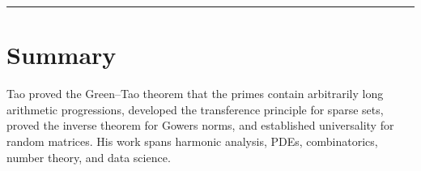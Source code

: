 \begin{center}\rule{0.5\linewidth}{0.5pt}\end{center}

\section*{Summary}

Tao proved the Green--Tao theorem \cite{greentao2008} that the primes contain arbitrarily long arithmetic progressions, developed the transference principle for sparse sets, proved the inverse theorem for Gowers norms, and established universality for random matrices. His work spans harmonic analysis, PDEs, combinatorics, number theory, and data science.

